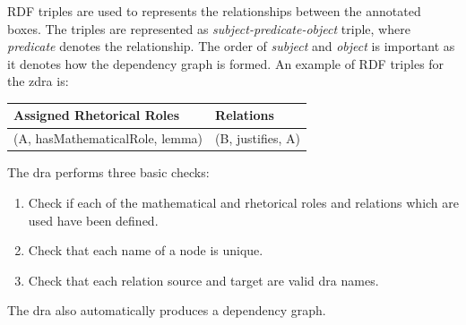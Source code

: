RDF triples \cite{Candan:2001:RDF:507533.507536} are used to represents the
relationships between the annotated boxes. The triples are represented as
\emph{subject-predicate-object} triple, where \emph{predicate} denotes the
relationship. The order of \emph{subject} and \emph{object} is important as it
denotes how the dependency graph is formed. An example of RDF triples for the
\gls{zdra} is:

\begin{table}[H]
\centering
\begin{tabular}{|l|l|}
\hline
\textbf{Assigned Rhetorical Roles} & \textbf{Relations} \\ 
\hline
(A, hasMathematicalRole, lemma) & (B, justifies, A) \\
\hline
\end{tabular}
\end{table}

The \gls{dra} performs three basic checks:

\begin{enumerate}
\item Check if each of the mathematical and rhetorical roles and relations which
are used have been defined.

\item Check that each name of a node is unique.

\item Check that each relation source and target are valid \gls{dra} names.
\end{enumerate}

The \gls{dra} also automatically produces a dependency graph.

